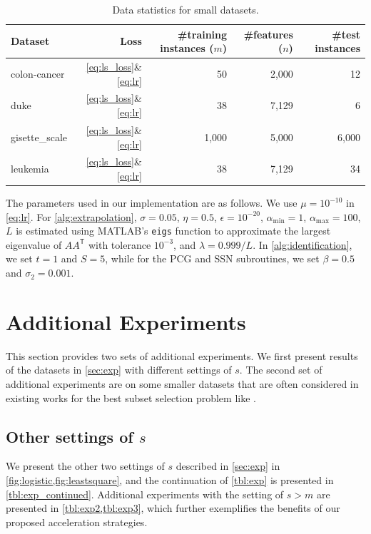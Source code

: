 \documentclass{article}
\theoremstyle{plain}
\theoremstyle{definition}
\theoremstyle{remark}
\newcommand*{\lmss}{\fontfamily{lmss}\selectfont}
\newcommand{\T}{\mathsf{T}}
\newcommand{\cp}[1]{\footnote{\textbf{CP:} #1}}
\newcommand{\jh}[1]{\footnote{\textbf{JH:} #1}}
\def\gisette{{\lmss gisette\_scale}\xspace}
\def\duke{{\lmss duke}\xspace}
\def\leu{{\lmss leukemia}\xspace}
\def\colon{{\lmss colon-cancer}\xspace}
\begin{document}
	\begin{table}[tbh]
	\caption{Data statistics for small datasets.}
	\label{tbl:data2}
	\centering
	\begin{tabular}{@{}lrrrr@{}}
		\toprule
		Dataset & Loss & \#training instances ($m$) 
		& \#features ($n$) & \#test instances
		\\
		\midrule
		\colon & \cref{eq:ls_loss}\&\cref{eq:lr} & 50 & 2,000 & 12\\
		\duke & \cref{eq:ls_loss}\&\cref{eq:lr} & 38 & 7,129 & 6\\
		\gisette & \cref{eq:ls_loss}\&\cref{eq:lr} & 1,000 & 5,000 &
		6,000 \\
		\leu & \cref{eq:ls_loss}\&\cref{eq:lr} & 38 & 7,129 &  34\\
		\bottomrule
	\end{tabular}
	\end{table}
The parameters used in our implementation are as follows.
We use $\mu = 10^{-10}$ in \cref{eq:lr}.
For \cref{alg:extrapolation}, $\sigma = 0.05$, $\eta = 0.5$, ${\epsilon
	= 10^{-20}}$, $\alpha_{\min}
= 1$, $\alpha_{\max} = 100$, $L$ is estimated using MATLAB's
\texttt{eigs} function to approximate the largest eigenvalue of $AA^\T$ with 
tolerance 
$10^{-3}$, and $\lambda = 0.999/L$.
In \cref{alg:identification}, we set $t = 1$ and $S = 5$, while for the
PCG and SSN subroutines, we set $\beta = 0.5$ and $\sigma_2 = 0.001$.

\section{Additional Experiments}
\label{sec:moreexp}
This section provides two sets of additional experiments.
We first present results of the datasets in \cref{sec:exp} with
different settings of $s$.
The second set of additional experiments are on some smaller datasets
that are often considered in existing works for the best subset
selection problem like \cite{BKM16}.


\subsection{Other settings of $s$}
We present the other two settings of $s$ described in \cref{sec:exp}
in \cref{fig:logistic,fig:leastsquare}, and the continuation of \cref{tbl:exp} 
is presented in \cref{tbl:exp_continued}. Additional experiments with the 
setting of $s>m$ are presented in \cref{tbl:exp2,tbl:exp3}, which further 
exemplifies the benefits of our proposed acceleration strategies. 
\end{document}
